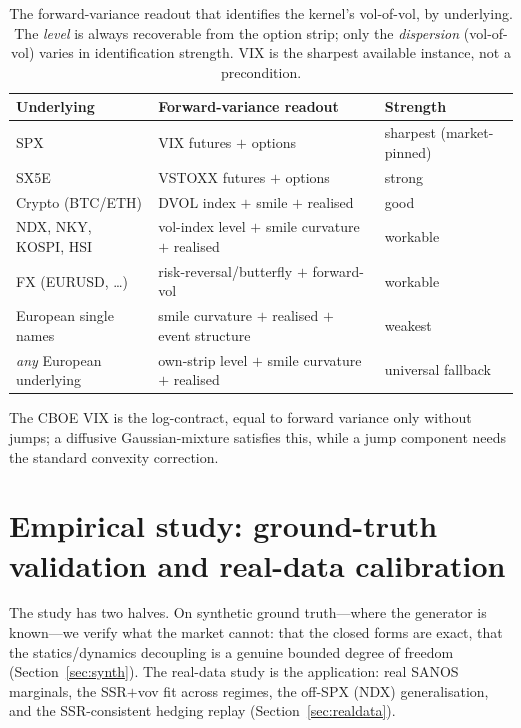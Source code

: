 \documentclass[11pt]{article}
\begin{document}
\begin{table}[h]
\centering\small
\setlength{\tabcolsep}{6pt}
\begin{tabular}{@{}lll@{}}
\toprule
Underlying & Forward-variance readout & Strength \\
\midrule
SPX & VIX futures $+$ options & sharpest (market-pinned) \\
SX5E & VSTOXX futures $+$ options & strong \\
Crypto (BTC/ETH) & DVOL index $+$ smile $+$ realised & good \\
NDX, NKY, KOSPI, HSI & vol-index level $+$ smile curvature $+$ realised & workable \\
FX (EURUSD, \dots) & risk-reversal/butterfly $+$ forward-vol & workable \\
European single names & smile curvature $+$ realised $+$ event structure & weakest \\
\midrule
\emph{any} European underlying & own-strip level $+$ smile curvature $+$ realised & universal fallback \\
\bottomrule
\end{tabular}
\caption{The forward-variance readout that identifies the kernel's vol-of-vol, by underlying.
The \emph{level} is always recoverable from the option strip; only the \emph{dispersion}
(vol-of-vol) varies in identification strength. VIX is the sharpest available instance, not a
precondition.}
\label{tab:readout}
\end{table}

The CBOE VIX is the log-contract, equal to forward variance only without jumps; a
diffusive Gaussian-mixture satisfies this, while a jump component needs the standard
convexity correction.

\section{Empirical study: ground-truth validation and real-data calibration}
\label{sec:experiments}

The study has two halves. On synthetic ground truth---where the generator is known---we verify
what the market cannot: that the closed forms are exact, that the statics/dynamics decoupling is a
genuine bounded degree of freedom (Section~\ref{sec:synth}). The real-data study is the application: real
SANOS marginals, the SSR$+$vov fit across regimes, the off-SPX (NDX) generalisation, and the
SSR-consistent hedging replay (Section~\ref{sec:realdata}).
\end{document}
